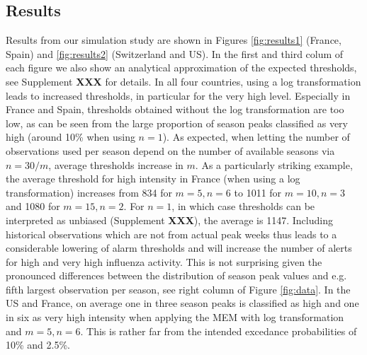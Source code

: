 \documentclass{article}
\begin{document}
\subsection{Results}

Results from our simulation study are shown in Figures \ref{fig:results1} (France, Spain) and \ref{fig:results2} (Switzerland and US). In the first and third colum of each figure we also show an analytical approximation of the expected thresholds, see Supplement \textbf{XXX} for details. In all four countries, using a log transformation leads to increased thresholds, in particular for the very high level. Especially in France and Spain, thresholds obtained without the log transformation are too low, as can be seen from the large proportion of season peaks classified as very high (around 10\% when using $n = 1$). As expected, when letting the number of observations used per season depend on the number of available seasons via $n = 30/m$, average thresholds increase in $m$. As a particularly striking example, the  average threshold for high intensity in France (when using a log transformation) increases from 834 for $m = 5, n = 6$ to 1011 for $m = 10, n = 3$ and 1080 for $m = 15, n = 2$. For $n = 1$, in which case thresholds can be interpreted as unbiased (Supplement \textbf{XXX}), the average is 1147. Including historical observations which are not from actual peak weeks thus leads to a considerable lowering of alarm thresholds and will increase the number of alerts for high and very high influenza activity. This is not surprising given the pronounced differences between the distribution of season peak values and e.g. fifth largest observation per season, see right column of Figure \ref{fig:data}. In the US and France, on average one in three season peaks is classified as high and one in six as very high intensity when applying the MEM with log transformation and $m = 5, n = 6$. This is rather far from the intended excedance probabilities of 10\% and 2.5\%.
\end{document}
